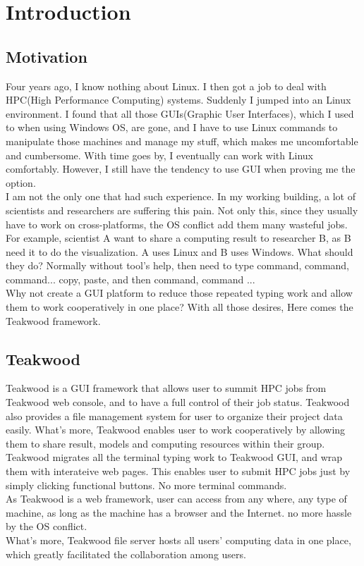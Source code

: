 \chapter{Introduction}

\section{Motivation}
Four years ago, I know nothing about Linux. I then got a job to deal with HPC(High Performance Computing) systems. Suddenly I jumped into an Linux environment. I found that all those GUIs(Graphic User Interfaces), which I used to when using Windows OS, are gone, and I have to use Linux commands to manipulate those machines and manage my stuff, which makes me uncomfortable and cumbersome. With time goes by, I eventually can work with Linux comfortably. However, I still have the tendency to use GUI when proving me the option.\\I am not the only one that had such experience. In my working building, a lot of scientists and researchers are suffering this pain. Not only this, since they usually have to work on cross-platforms, the OS conflict add them many wasteful jobs. For example, scientist A want to share a computing result to researcher B, as B need it to do the visualization. A uses Linux and B uses Windows. What should they do? Normally without tool's help, then need to type command, command, command... copy, paste, and then command, command ...\\Why not create a GUI platform to reduce those repeated typing work and allow them to work cooperatively in one place? With all those desires, Here comes the Teakwood framework.

\section{Teakwood}
Teakwood is a GUI framework that allows user to summit HPC jobs from Teakwood web console, and to have a full control of their job status. Teakwood also provides a file management system for user to organize their project data easily. What's more, Teakwood enables user to work cooperatively by allowing them to share result, models and computing resources within their group. \\
Teakwood migrates all the terminal typing work to Teakwood GUI, and wrap them with interateive web pages. This enables user to submit HPC jobs just by simply  clicking functional buttons. No more terminal commands.\\
As Teakwood is a web framework, user can access from any where, any type of machine, as long as the machine has a browser and the Internet. no more hassle by the OS conflict.\\
What's more, Teakwood file server hosts all users' computing data in one place, which greatly facilitated the collaboration among users.


